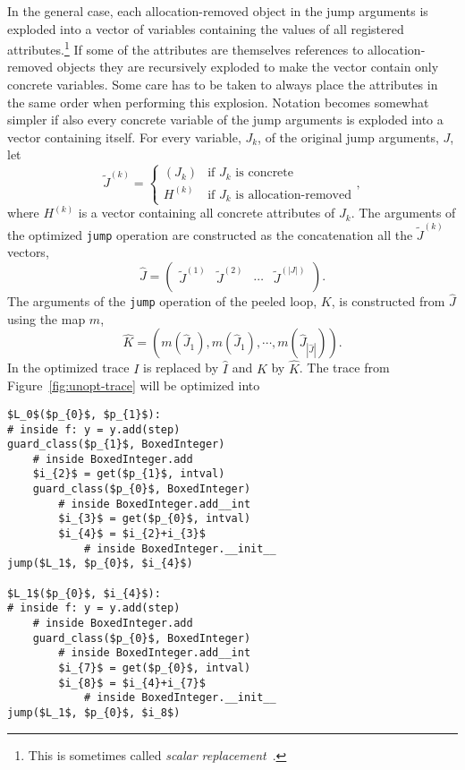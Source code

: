 \documentclass[preprint]{sigplanconf}
\let\oldcite=\cite
\renewcommand\cite[1]{\ifthenelse{\equal{#1}{XXX}}{[citation~needed]}{\oldcite{#1}}}
\begin{document}
In the general case, each allocation-removed object in the jump arguments is exploded into a
vector of variables containing the values of all registered
attributes.\footnote{This is sometimes called \emph{scalar replacement}~\cite{kotzmann_escape_2005}.}
If some of the attributes are themselves references to
allocation-removed objects they are recursively exploded
to make the vector contain only concrete variables. Some care has
to be taken to always place the attributes in the same order when
performing this explosion. Notation becomes somewhat simpler if also every
concrete variable of the jump arguments is exploded into a vector containing
itself. For
every variable, $J_k$, of the original jump arguments, $J$, let
\begin{equation}
  \tilde J^{\left(k\right)} = \left\{
      \begin{array}{ll}
        \left(J_k\right)  & \text{if $J_k$ is concrete} \\
        H^{\left(k\right)} & \text{if $J_k$ is allocation-removed}
      \end{array}
  \right.
  ,
\end{equation}
where $H^{\left(k\right)}$ is a vector containing all concrete
attributes of $J_k$. The arguments of the optimized \lstinline{jump}
operation are constructed as the concatenation all the $\tilde J^{\left(k\right)}$ vectors,
\begin{equation}
  \hat J = \left( 
    \begin{array}{cccc}
      \tilde J^{\left(1\right)} & \tilde J^{\left(2\right)} & \cdots &
      \tilde J^{\left(|J|\right)} \\
    \end{array}
  \right)      
  .
\end{equation}
The arguments of the \lstinline{jump} operation of the peeled loop,
$K$, is constructed from $\hat J$ using the map $m$,
\begin{equation}
  \hat K = \left(m\left(\hat J_1\right), m\left(\hat J_1\right), 
                 \cdots, m\left(\hat J_{|\hat J|}\right)\right)
  .
\end{equation}
In the optimized trace $I$ is replaced by $\hat I$ and $K$ by $\hat
K$. The trace from Figure~\ref{fig:unopt-trace} will be optimized into

\begin{lstlisting}[mathescape,numbers = right,basicstyle=\setstretch{1.05}\ttfamily\scriptsize]
$L_0$($p_{0}$, $p_{1}$):
# inside f: y = y.add(step)
guard_class($p_{1}$, BoxedInteger)
    # inside BoxedInteger.add
    $i_{2}$ = get($p_{1}$, intval)
    guard_class($p_{0}$, BoxedInteger)
        # inside BoxedInteger.add__int
        $i_{3}$ = get($p_{0}$, intval)
        $i_{4}$ = $i_{2}+i_{3}$
            # inside BoxedInteger.__init__
jump($L_1$, $p_{0}$, $i_{4}$)

$L_1$($p_{0}$, $i_{4}$):
# inside f: y = y.add(step)
    # inside BoxedInteger.add
    guard_class($p_{0}$, BoxedInteger)
        # inside BoxedInteger.add__int
        $i_{7}$ = get($p_{0}$, intval)
        $i_{8}$ = $i_{4}+i_{7}$
            # inside BoxedInteger.__init__
jump($L_1$, $p_{0}$, $i_8$)
\end{lstlisting}
\end{document}
